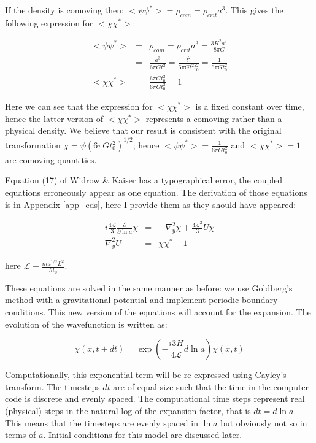 \noindent If the density is comoving then: $<\psi \psi^*>= \rho_{com} = \rho_{crit} a^3 $. This gives the following expression for $<\chi \chi^*>$:

\begin{eqnarray}
<\psi \psi^*> &=& \rho_{com} = \rho_{crit} a^3 = \frac{3 H^2 a^3}{8\pi G} \\
	 &=& \frac{a^3}{6\pi G t^2} = \frac{t^2}{6\pi G t^2 t_0^2} = \frac{1}{6\pi G t_0^2} \\
<\chi \chi^*> &=& \frac{6\pi G t_0^2}{6\pi G t_0^2} = 1
\end{eqnarray}

\noindent Here we can see that the expression for $<\chi \chi^*>$ is a fixed constant over time, hence the latter version of $<\chi \chi^*>$ represents a comoving rather than a physical density. We believe that our result is consistent with the original transformation $\chi = \psi (6 \pi G t_0^2 )^{1/2}$; hence $<\psi \psi^*> = \frac{1}{6\pi G t_0^2}$ and $<\chi \chi^*> = 1$ are comoving quantities.

Equation (17) of Widrow \& Kaiser has a typographical error, the coupled equations erroneously appear as one equation. The derivation of those equations is in Appendix \ref{app_eds}, here I provide them as they should have appeared:

\begin{eqnarray}
i \frac{4\mathcal{L}}{3} \frac{\partial}{\partial \ln a}\chi &=& -\nabla_y^2 \chi + \frac{4\mathcal{L}^2}{3} U \chi \\
\nabla_y^2 U &=& \chi\chi^* - 1
\end{eqnarray}

\noindent here $\mathcal{L} = \frac{m a^{1/2}L^2}{\hbar t_0}$.

These equations are solved in the same manner as before: we use Goldberg's method with a gravitational potential and implement periodic boundary conditions. This new version of the equations will account for the expansion. The evolution of the wavefunction is written as:

\begin{equation}
\chi(x, t+dt) = \exp(-\frac{i 3 H}{4 \mathcal{L}} d \ln a) \chi(x,t)
\end{equation}

\noindent Computationally, this exponential term will be re-expressed using Cayley's transform. The timesteps $dt$ are of equal size such that the time in the computer code is discrete and evenly spaced. The computational time steps represent real (physical) steps in the natural log of the expansion factor, that is $dt = d \ln a$. This means that the timesteps are evenly spaced in $\ln a$ but obviously not so in terms of $a$. Initial conditions for this model are discussed later.


